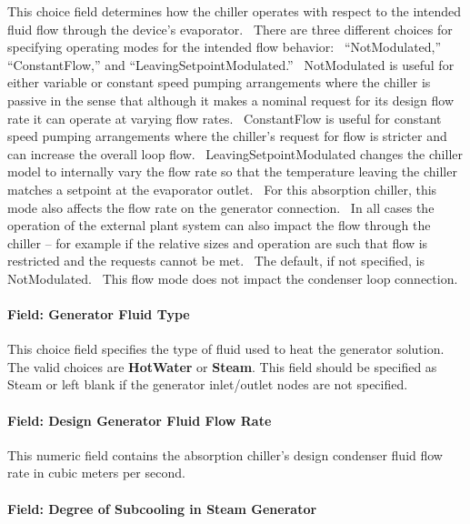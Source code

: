 This choice field determines how the chiller operates with respect to the intended fluid flow through the device's evaporator. ~There are three different choices for specifying operating modes for the intended flow behavior:~ ``NotModulated,'' ``ConstantFlow,'' and ``LeavingSetpointModulated.''~ NotModulated is useful for either variable or constant speed pumping arrangements where the chiller is passive in the sense that although it makes a nominal request for its design flow rate it can operate at varying flow rates.~ ConstantFlow is useful for constant speed pumping arrangements where the chiller's request for flow is stricter and can increase the overall loop flow.~ LeavingSetpointModulated changes the chiller model to internally vary the flow rate so that the temperature leaving the chiller matches a setpoint at the evaporator outlet.~ For this absorption chiller, this mode also affects the flow rate on the generator connection.~ In all cases the operation of the external plant system can also impact the flow through the chiller -- for example if the relative sizes and operation are such that flow is restricted and the requests cannot be met.~ The default, if not specified, is NotModulated.~ This flow mode does not impact the condenser loop connection.

\paragraph{Field: Generator Fluid Type}\label{field-generator-fluid-type}

This choice field specifies the type of fluid used to heat the generator solution. The valid choices are \textbf{HotWater} or \textbf{Steam}. This field should be specified as Steam or left blank if the generator inlet/outlet nodes are not specified.

\paragraph{Field: Design Generator Fluid Flow Rate}\label{field-design-generator-fluid-flow-rate}

This numeric field contains the absorption chiller's design condenser fluid flow rate in cubic meters per second.

\paragraph{Field: Degree of Subcooling in Steam Generator}\label{field-degree-of-subcooling-in-steam-generator}

